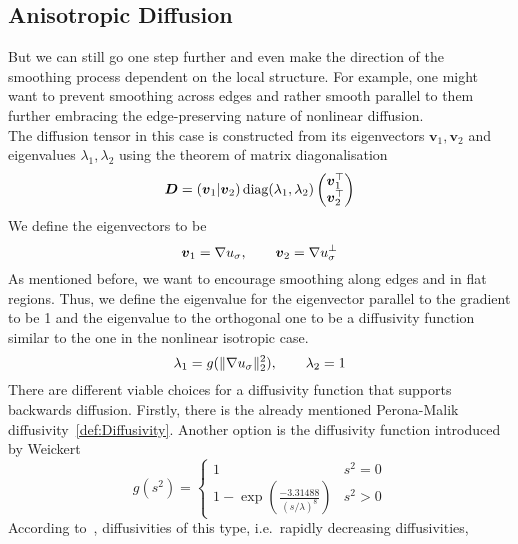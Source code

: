 \subsection{Anisotropic Diffusion}
But we can still go one step further and even make the direction of the smoothing process dependent
on the local structure. For example, one might want to prevent smoothing across edges and rather
smooth parallel to them further embracing the edge-preserving nature of nonlinear diffusion.\\
The diffusion tensor in this case is constructed from its eigenvectors $\boldsymbol v_1,
\boldsymbol v_2$ and eigenvalues $\lambda_1, \lambda_2$ using the
theorem of matrix diagonalisation
\begin{equation}\label{eq:DiffTensor}
    \boldsymbol D = \left(\boldsymbol v_1\vert \boldsymbol v_2\right) \textnormal{diag}(\lambda_1, \lambda_2)
    \begin{pmatrix}
        \boldsymbol v_1^\top\\
        \boldsymbol v_2^\top
    \end{pmatrix}
\end{equation}
We define the eigenvectors to be
\begin{equation}
    \boldsymbol v_1 = \mathbf{\nabla} u_\sigma,\qquad\boldsymbol v_2 = \mathbf{\nabla} u_\sigma^\bot
\end{equation}
As mentioned before, we want to encourage smoothing along edges and in flat regions. Thus, we
define the eigenvalue for the eigenvector parallel to the gradient to be 1 and the eigenvalue to
the orthogonal one to be a diffusivity function similar to the one in the nonlinear isotropic case.
\begin{equation}
    \lambda_1 = g(\lVert\mathbf{\nabla} u_\sigma\rVert_2^2),\qquad\lambda_2 = 1
\end{equation}
There are different viable choices for a diffusivity function that supports backwards diffusion.
Firstly, there is the already mentioned Perona-Malik diffusivity~\eqref{def:Diffusivity}. Another
option is the diffusivity function introduced by Weickert\cite{weickert96}
\begin{equation}
    g(s^2) = \begin{cases}
        1 & s^2 = 0\\
        1 - \exp\left(\frac{-3.31488}{{(s/\lambda)}^8}\right) & s^2 > 0
    \end{cases}\label{def:WeickertDiff}
\end{equation}
According to~\cite{dic}, diffusivities of this type, i.e.\ rapidly decreasing diffusivities,
